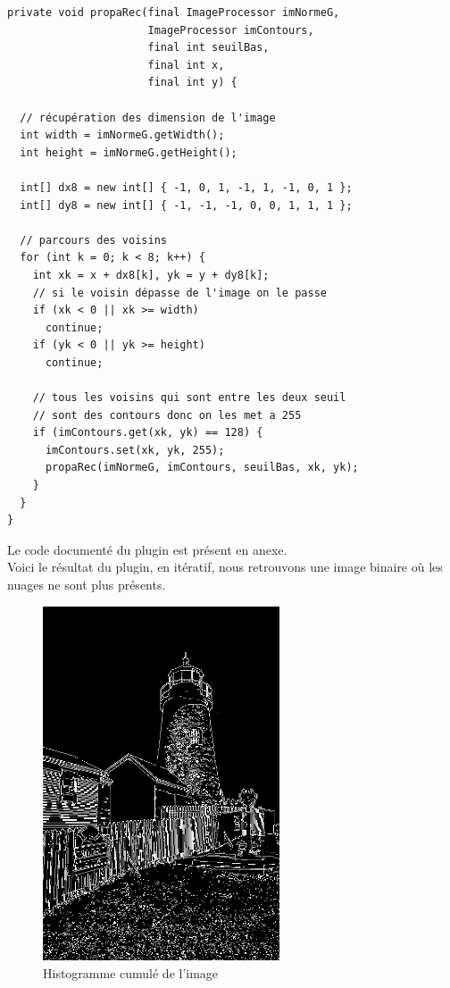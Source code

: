 \documentclass[a4paper,11pt]{article}
\begin{document}
  \begin{lstlisting}[caption=Fonction qui va déterminer si les contours entre les deux seuils sont corrects]
private void propaRec(final ImageProcessor imNormeG,
                      ImageProcessor imContours, 
                      final int seuilBas, 
                      final int x,
                      final int y) {

  // récupération des dimension de l'image
  int width = imNormeG.getWidth();
  int height = imNormeG.getHeight();

  int[] dx8 = new int[] { -1, 0, 1, -1, 1, -1, 0, 1 };
  int[] dy8 = new int[] { -1, -1, -1, 0, 0, 1, 1, 1 };

  // parcours des voisins
  for (int k = 0; k < 8; k++) {
    int xk = x + dx8[k], yk = y + dy8[k];
    // si le voisin dépasse de l'image on le passe
    if (xk < 0 || xk >= width)
      continue;
    if (yk < 0 || yk >= height)
      continue;

    // tous les voisins qui sont entre les deux seuil
    // sont des contours donc on les met a 255
    if (imContours.get(xk, yk) == 128) {
      imContours.set(xk, yk, 255);
      propaRec(imNormeG, imContours, seuilBas, xk, yk);
    }
  }
}
  \end{lstlisting}
  
  Le code documenté du plugin est présent en anexe.\\

  Voici le résultat du plugin, en itératif, nous retrouvons une image binaire où les nuages ne sont 
  plus présents.\\
  
  \begin{figure}[H]
  \center
   \includegraphics[width=7cm]{../canny_ite.png}
   \caption{Histogramme cumulé de l'image}
  \end{figure}
  
\end{document}
